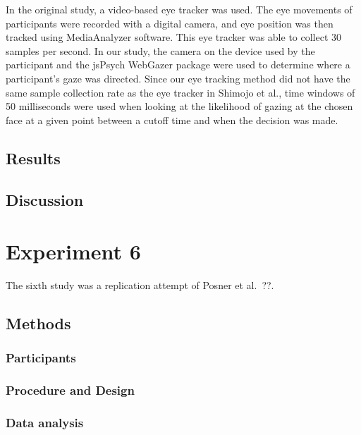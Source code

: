 \documentclass[
  english,
  man,floatsintext]{apa6}
\begin{document}
In the original study, a video-based eye tracker was used. The eye movements of participants were recorded with a digital camera, and eye position was then tracked using MediaAnalyzer software. This eye tracker was able to collect 30 samples per second. In our study, the camera on the device used by the participant and the jsPsych WebGazer package were used to determine where a participant's gaze was directed. Since our eye tracking method did not have the same sample collection rate as the eye tracker in Shimojo et al., time windows of 50 milliseconds were used when looking at the likelihood of gazing at the chosen face at a given point between a cutoff time and when the decision was made.

\hypertarget{results-4}{%
\subsection{Results}\label{results-4}}

\hypertarget{discussion-4}{%
\subsection{Discussion}\label{discussion-4}}

\hypertarget{experiment-6}{%
\section{Experiment 6}\label{experiment-6}}

The sixth study was a replication attempt of Posner et al.~??.

\hypertarget{methods-5}{%
\subsection{Methods}\label{methods-5}}

\hypertarget{participants-6}{%
\subsubsection{Participants}\label{participants-6}}

\hypertarget{procedure-and-design-1}{%
\subsubsection{Procedure and Design}\label{procedure-and-design-1}}

\hypertarget{data-analysis-3}{%
\subsubsection{Data analysis}\label{data-analysis-3}}
\end{document}
